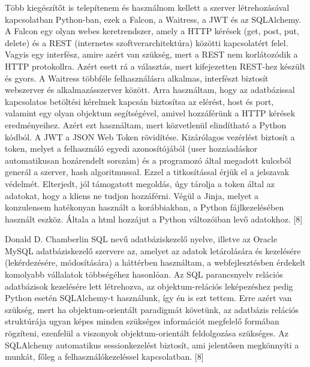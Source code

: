 
Több kiegészítőt is telepítenem és használnom kellett a szerver létrehozásával kapcsolatban Python-ban, ezek a Falcon, a Waitress, a JWT és az SQLAlchemy. A Falcon egy olyan webes keretrendszer, amely a HTTP kérések (get, post, put, delete) és a REST (internetes szoftverarchitektúra) közötti  kapcsolatért felel. Vagyis egy interfész, amire azért van szükség, mert a REST nem korlátozódik a HTTP protokollra. Azért esett rá a választás, mert kifejezetten REST-hez készült és gyors. A Waitress többféle felhasználásra alkalmas, interfészt biztosít webszerver és alkalmazásszerver között. Arra használtam, hogy az adatbázissal kapcsolatos betöltési kérelmek kapcsán biztosítsa az elérést, host és port, valamint egy olyan objektum segítségével, amivel hozzáférünk a HTTP kérések eredményeihez. Azért ezt használtam, mert közvetlenül elindítható a Python kódból. A JWT a JSON Web Token rövidítése. Kizárólagos vezérlést biztosít a token, melyet a felhasználó egyedi azonosítójából (user hozzáadáskor automatikusan hozárendelt sorszám) és a programozó által megadott kulcsból generál a szerver, hash algoritmussal. Ezzel a titkosítással érjük el a jelszavak védelmét. Elterjedt, jól támogatott megoldás, úgy tárolja a token által az adatokat, hogy a kliens ne tudjon hozzáférni. Végül a Jinja, melyet a konzulensem hatékonyan használt a korábbiakban, a Python fájlkezelésében használt eszköz. Általa a html hozzájut a Python változóiban levő adatokhoz. [8]


Donald D. Chamberlin SQL nevű adatbáziskezelő nyelve, illetve az Oracle MySQL 
adatbáziskezelő szervere az, amelyet az adatok letárolására és kezelésére (lekérdezésére, 
módosítására) a háttérben használtam, a webfejlesztésben érdekelt komolyabb vállalatok 
többségéhez hasonlóan. Az SQL parancsnyelv relációs adatbázisok kezelésére lett létrehozva, 
az objektum-relációs leképezéshez pedig Python esetén SQLAlchemy-t használunk, így én is ezt 
tettem. Erre azért van szükség, mert ha objektum-orientált paradigmát követünk, az adatbázis 
relációs struktúrája ugyan képes minden szükséges információt megfelelő formában rögzíteni, 
ezenfelül a viszonyok objektum-orientált feldolgozása szükséges. Az SQLAlchemy automatikus 
sessionkezelést biztosít, ami jelentősen megkönnyíti a munkát, főleg a felhasználókezeléssel 
kapcsolatban. [8]


